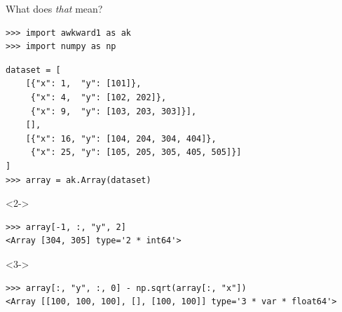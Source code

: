 \documentclass[aspectratio=169]{beamer}
\begin{document}
\begin{frame}[fragile]{What does {\it that} mean?}
\vspace{0.3 cm}

\small
\begin{verbatim}
>>> import awkward1 as ak
>>> import numpy as np
\end{verbatim}

\begin{verbatim}
dataset = [
    [{"x": 1,  "y": [101]},
     {"x": 4,  "y": [102, 202]},
     {"x": 9,  "y": [103, 203, 303]}],
    [],
    [{"x": 16, "y": [104, 204, 304, 404]},
     {"x": 25, "y": [105, 205, 305, 405, 505]}]
]
>>> array = ak.Array(dataset)
\end{verbatim}

\begin{uncoverenv}<2->
\begin{verbatim}
>>> array[-1, :, "y", 2]
<Array [304, 305] type='2 * int64'>
\end{verbatim}
\end{uncoverenv}

\begin{uncoverenv}<3->
\begin{verbatim}
>>> array[:, "y", :, 0] - np.sqrt(array[:, "x"])
<Array [[100, 100, 100], [], [100, 100]] type='3 * var * float64'>
\end{verbatim}
\end{uncoverenv}
\end{frame}
\end{document}
